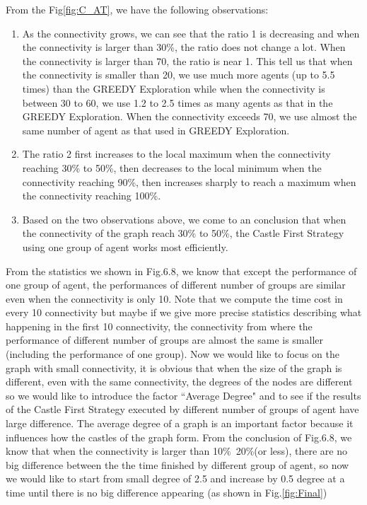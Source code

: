 From the Fig\ref{fig:C_AT}, we have the following observations:
\begin{enumerate}
\item As the connectivity grows, we can see that the ratio 1 is decreasing and when the connectivity is larger than 30\%, the ratio does not change a lot. When the connectivity is larger than 70, the ratio is near 1. This tell us that when the connectivity is smaller than 20, we use much more agents (up to 5.5 times) than the GREEDY Exploration while when the connectivity is between 30 to 60, we use 1.2 to 2.5 times as many agents as that in the GREEDY Exploration. When the connectivity exceeds 70, we use almost the same number of agent as that used in GREEDY Exploration.   
\item The ratio 2 first increases to the local maximum when the connectivity reaching 30\% to 50\%, then decreases to the local minimum when the connectivity reaching 90\%, then increases sharply to reach a maximum when the connectivity reaching 100\%.
\item Based on the two observations above, we come to an conclusion that when the connectivity of the graph reach 30\% to 50\%, the Castle First Strategy using one group of agent works most efficiently.
\end{enumerate}

From the statistics we shown in Fig.6.8, we know that except the performance of one group of agent, the performances of different number of groups are similar even when the connectivity is only 10. Note that we compute the time cost in every 10 connectivity but maybe if we give more precise statistics describing what happening in the first 10 connectivity, the connectivity from where the performance of different number of groups are almost the same is smaller (including the performance of one group). Now we would like to focus on the graph with small connectivity, it is obvious that when the size of the graph is different, even with the same connectivity, the degrees of the nodes are different so we would like to introduce the factor ``Average Degree" and to see if the results of the Castle First Strategy executed by different number of groups of agent have large difference. The average degree of a graph is an important factor because it influences how the castles of the graph form. From the conclusion of Fig.6.8, we know that when the connectivity is larger than 10\%~20\%(or less), there are no big difference between the the time finished by different group of agent, so now we would like to start from small degree of 2.5 and increase by 0.5 degree at a time until there is no big difference appearing (as shown in Fig.\ref{fig:Final})

